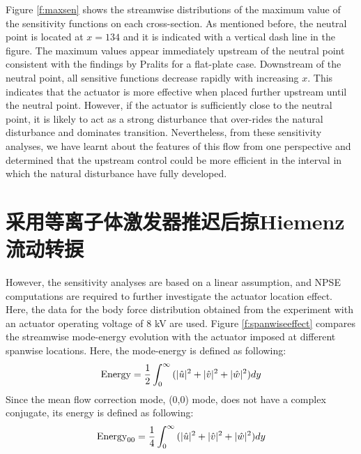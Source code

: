 Figure \ref{f:maxsen} shows the streamwise distributions of the maximum value of the sensitivity functions on each cross-section. As mentioned before, the neutral point is located at $x=134$ and it is indicated with a vertical dash line in the figure. The maximum values appear immediately upstream of the neutral point consistent with the findings by Pralits \cite{pralits2000sensitivity} for a flat-plate case. Downstream of the neutral point, all sensitive functions decrease rapidly with increasing $x$. This indicates that the actuator is more effective when placed further upstream until the neutral point. However, if the actuator is sufficiently close to the neutral point, it is likely to act as a strong disturbance that over-rides the natural disturbance and dominates transition. Nevertheless, from these sensitivity analyses, we have learnt about the features of this flow from one perspective and determined that the upstream control could be more efficient in the interval in which the natural disturbance have fully developed.
\section{采用等离子体激发器推迟后掠Hiemenz流动转捩}
However, the sensitivity analyses are based on a linear assumption, and NPSE computations are required to further investigate the actuator location effect. Here, the data for the body force distribution obtained from the experiment \cite{kriegseis2013velocity} with an actuator operating voltage of 8 kV are used. Figure \ref{f:spanwiseeffect} compares the streamwise mode-energy evolution with the actuator imposed at different spanwise locations. Here, the mode-energy is defined as following:
\begin{equation}
{\rm Energy}=\frac{1}{2}\int_{0}^{\infty}{(|\hat u|^2+|\hat v|^2+|\hat w|^2)dy}
\end{equation}
Since the mean flow correction mode, (0,0) mode, does not have a complex conjugate, its energy is defined as following:
\begin{equation}
{\rm Energy}_{00}=\frac{1}{4}\int_{0}^{\infty}{(|\hat u|^2+|\hat v|^2+|\hat w|^2)dy}
\end{equation}

